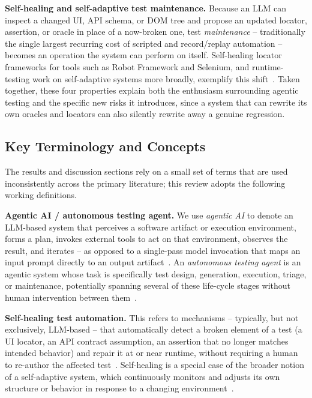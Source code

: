 \textbf{Self-healing and self-adaptive test maintenance.} Because an
LLM can inspect a changed UI, API schema, or DOM tree and propose an
updated locator, assertion, or oracle in place of a now-broken one,
test \emph{maintenance} -- traditionally the single largest recurring
cost of scripted and record/replay automation -- becomes an operation
the system can perform on itself. Self-healing locator frameworks for
tools such as Robot Framework and Selenium, and runtime-testing work on
self-adaptive systems more broadly, exemplify this
shift~\cite{h2nd,rohamo2024robotframework,ijam2025healenium,joseph2026zerocost,weyns2019,wohlrab2021}.
Taken together, these four properties explain both the enthusiasm
surrounding agentic testing and the specific new risks it introduces,
since a system that can rewrite its own oracles and locators can also
silently rewrite away a genuine regression.

\subsection{Key Terminology and Concepts}
The results and discussion sections rely on a small set of terms that
are used inconsistently across the primary literature; this review
adopts the following working definitions.

\textbf{Agentic AI / autonomous testing agent.} We use \emph{agentic
AI} to denote an LLM-based system that perceives a software artifact
or execution environment, forms a plan, invokes external tools to act
on that environment, observes the result, and iterates -- as opposed to
a single-pass model invocation that maps an input prompt directly to
an output artifact~\cite{slr0042024,slr0052024,slr0062024}. An
\emph{autonomous testing agent} is an agentic system whose task is
specifically test design, generation, execution, triage, or
maintenance, potentially spanning several of these life-cycle stages
without human intervention between them~\cite{slr0882020,slr0662026}.

\textbf{Self-healing test automation.} This refers to mechanisms --
typically, but not exclusively, LLM-based -- that automatically detect
a broken element of a test (a UI locator, an API contract assumption,
an assertion that no longer matches intended behavior) and repair it at
or near runtime, without requiring a human to re-author the affected
test~\cite{h2nd,rohamo2024robotframework,ijam2025healenium}. Self-healing
is a special case of the broader notion of a self-adaptive system,
which continuously monitors and adjusts its own structure or behavior
in response to a changing environment~\cite{weyns2019,hnsel2018,sa42021}.

